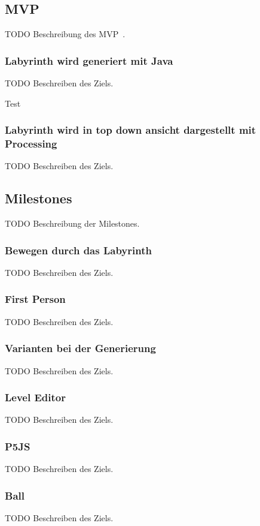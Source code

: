 \subsection{MVP}\label{subsec:mvp}
    TODO Beschreibung des MVP~.


    \subsubsection*{Labyrinth wird generiert mit Java}
        TODO Beschreiben des Ziels.
        
        Test
        
       


    \subsubsection*{Labyrinth wird in top down ansicht dargestellt mit Processing}
        TODO Beschreiben des Ziels.


\subsection{Milestones}\label{subsec:milestones}
    TODO Beschreibung der Milestones.


    \subsubsection*{Bewegen durch das Labyrinth}
        TODO Beschreiben des Ziels.


    \subsubsection*{First Person}
        TODO Beschreiben des Ziels.


    \subsubsection*{Varianten bei der Generierung}
        TODO Beschreiben des Ziels.


    \subsubsection*{Level Editor}
        TODO Beschreiben des Ziels.


    \subsubsection*{P5JS}
        TODO Beschreiben des Ziels.


    \subsubsection*{Ball}
        TODO Beschreiben des Ziels.
